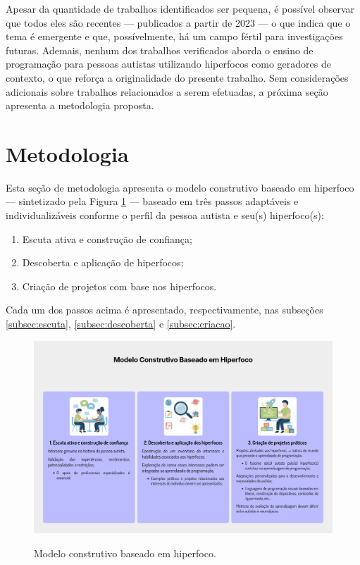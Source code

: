 \documentclass[
  12pt,
  a4paper,
]{article}
\providecommand{\tightlist}{%
  \setlength{\itemsep}{0pt}\setlength{\parskip}{0pt}}
\begin{document}
Apesar da quantidade de trabalhos identificados ser pequena, é possível
observar que todos eles são recentes --- publicados a partir de 2023 ---
o que indica que o tema é emergente e que, possívelmente, há um campo
fértil para investigações futuras. Ademais, nenhum dos trabalhos
verificados aborda o ensino de programação para pessoas autistas
utilizando hiperfocos como geradores de contexto, o que reforça a
originalidade do presente trabalho. Sem considerações adicionais sobre
trabalhos relacionados a serem efetuadas, a próxima seção apresenta a
metodologia proposta.

\section{Metodologia}\label{sec:metodologia}

Esta seção de metodologia apresenta o modelo construtivo baseado em
hiperfoco --- sintetizado pela Figura \ref{fig:modelohiperfocos} ---
baseado em três passos adaptáveis e individualizáveis conforme o perfil
da pessoa autista e seu(s) hiperfoco(s):

\begin{enumerate}
\def\labelenumi{\arabic{enumi}.}
\tightlist
\item
  Escuta ativa e construção de confiança;
\item
  Descoberta e aplicação de hiperfocos;
\item
  Criação de projetos com base nos hiperfocos.
\end{enumerate}

Cada um dos passos acima é apresentado, respectivamente, nas subseções
\ref{subsec:escuta}, \ref{subsec:descoberta} e \ref{subsec:criacao}.

\begin{figure}[H]
  \centering
  \caption{Modelo construtivo baseado em hiperfoco.}
  \includegraphics[width=1.0\textwidth]{./images/modelo_construtivo_hiperfoco.png}
  \label{fig:modelohiperfocos}
\end{figure}
\end{document}
